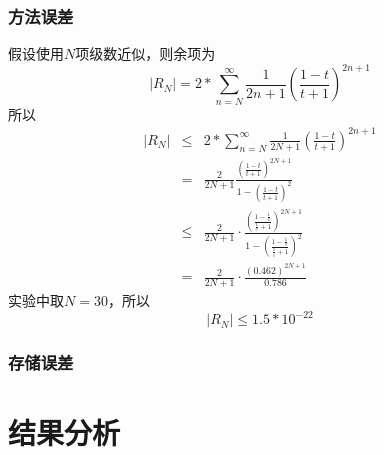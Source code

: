 \documentclass[UTF8,twocolum,titlepage]{ctexart}
\begin{document}
\subsubsection*{方法误差}
假设使用$N$项级数近似，则余项为$$\left|R_N\right| =  2*\sum_{n=N}^{\infty}\frac{1}{2n+1}\left(\frac{1-t}{t+1}\right)^{2n+1}$$所以
\begin{eqnarray*}
\left|R_N\right| &\le& 2*\sum_{n=N}^{\infty}\frac{1}{2N+1}\left(\frac{1-t}{t+1}\right)^{2n+1} \\ &=& \frac{2}{2N+1}\frac{\left(\frac{1-t}{t+1}\right)^{2N+1}}{1-\left(\frac{1-t}{t+1}\right)^2}\\&\le& \frac{2}{2N+1}\cdot\frac{\left(\frac{1-\frac{1}{e}}{\frac{1}{e}+1}\right)^{2N+1}}{1-\left(\frac{1-\frac{1}{e}}{\frac{1}{e}+1}\right)^2}\\&=&\frac{2}{2N+1}\cdot\frac{\left(0.462\right)^{2N+1}}{0.786}
\end{eqnarray*}
实验中取$N=30$，所以$$\left|R_N\right| \le 1.5*10^{-22}$$
\subsubsection*{存储误差}

\section*{结果分析}

\newpage
\renewcommand\refname{参考文献}


\end{document}
